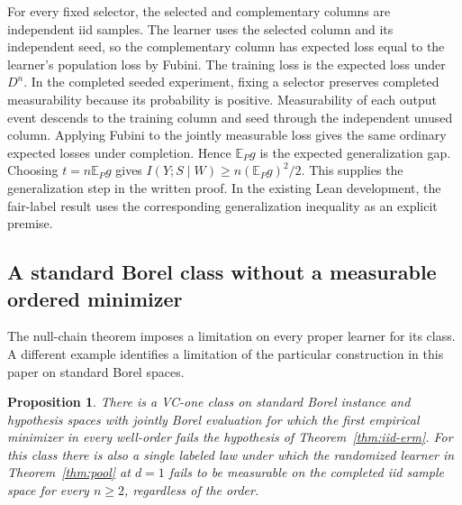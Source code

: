 \documentclass[11pt]{article}
\newtheorem{proposition}[theorem]{Proposition}
\theoremstyle{definition}\newtheorem{definition}[theorem]{Definition}
\newcommand{\E}{\mathbb E}
\begin{document}
For every fixed selector, the selected and complementary columns are
independent iid samples. The learner uses the selected column and its
independent seed, so the complementary column has expected loss equal to
the learner's population loss by Fubini. The training loss is the expected
loss under $D^n$. In the completed seeded experiment, fixing a selector
preserves completed measurability because its probability is positive.
Measurability of each output event descends to the training column and
seed through the independent unused column. Applying Fubini to the
jointly measurable loss gives the same ordinary expected losses under
completion. Hence $\E_P g$ is the expected generalization gap. Choosing
$t=n\E_P g$ gives $I(Y;S\mid W)\ge n(\E_P g)^2/2$.
This supplies the generalization step in the written proof. In the
existing Lean development, the fair-label result uses the corresponding
generalization inequality as an explicit premise.

\subsection{A standard Borel class without a measurable ordered minimizer}

The null-chain theorem imposes a limitation on every proper learner for its
class. A different example identifies a limitation of the particular
construction in this paper on standard Borel spaces.

\begin{proposition}\label{prop:circle}
There is a VC-one class on standard Borel instance and hypothesis spaces
with jointly Borel evaluation for which the first empirical minimizer in
every well-order fails the hypothesis of Theorem~\ref{thm:iid-erm}.
For this class there is also a single labeled law under which the randomized
learner in Theorem~\ref{thm:pool} at $d=1$ fails to be measurable on the
completed iid sample space for every $n\ge2$, regardless of the order.
\end{proposition}
\end{document}
